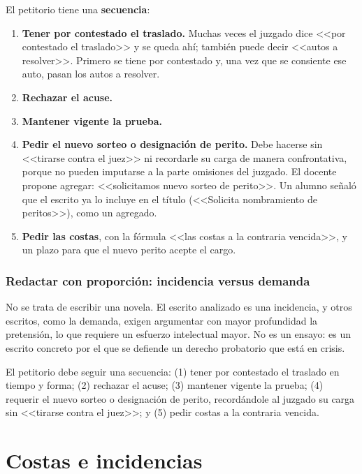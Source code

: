 \documentclass[12pt,oneside]{book}
\begin{document}
El petitorio tiene una \textbf{secuencia}:

\begin{enumerate}
    \item \textbf{Tener por contestado el traslado.} Muchas veces el juzgado dice <<por contestado el traslado>> y se queda ahí; también puede decir <<autos a resolver>>. Primero se tiene por contestado y, una vez que se consiente ese auto, pasan los autos a resolver.
    \item \textbf{Rechazar el acuse.}
    \item \textbf{Mantener vigente la prueba.}
    \item \textbf{Pedir el nuevo sorteo o designación de perito.} Debe hacerse sin <<tirarse contra el juez>> ni recordarle su carga de manera confrontativa, porque no pueden imputarse a la parte omisiones del juzgado. El docente propone agregar: <<solicitamos nuevo sorteo de perito>>. Un alumno señaló que el escrito ya lo incluye en el título (<<Solicita nombramiento de peritos>>), como un agregado.
    \item \textbf{Pedir las costas}, con la fórmula <<las costas a la contraria vencida>>, y un plazo para que el nuevo perito acepte el cargo.
\end{enumerate}

\subsection{Redactar con proporción: incidencia versus demanda}

No se trata de escribir una novela. El escrito analizado es una incidencia, y otros escritos, como la demanda, exigen argumentar con mayor profundidad la pretensión, lo que requiere un esfuerzo intelectual mayor. No es un ensayo: es un escrito concreto por el que se defiende un derecho probatorio que está en crisis.

\begin{important}
El petitorio debe seguir una secuencia: (1) tener por contestado el traslado en tiempo y forma; (2) rechazar el acuse; (3) mantener vigente la prueba; (4) requerir el nuevo sorteo o designación de perito, recordándole al juzgado su carga sin <<tirarse contra el juez>>; y (5) pedir costas a la contraria vencida.
\end{important}

\chapter{Costas e incidencias}
\end{document}
